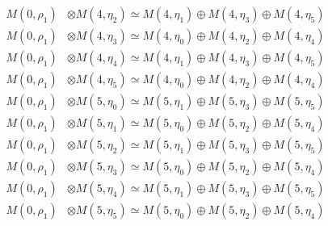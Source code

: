\begin{align*}
M(0,\rho_{1}) &\otimes M(4,\eta_{2}) \simeq M(4,\eta_{1}) \oplus M(4,\eta_{3}) \oplus M(4,\eta_{5}) \\
M(0,\rho_{1}) &\otimes M(4,\eta_{3}) \simeq M(4,\eta_{0}) \oplus M(4,\eta_{2}) \oplus M(4,\eta_{4}) \\
M(0,\rho_{1}) &\otimes M(4,\eta_{4}) \simeq M(4,\eta_{1}) \oplus M(4,\eta_{3}) \oplus M(4,\eta_{5}) \\
M(0,\rho_{1}) &\otimes M(4,\eta_{5}) \simeq M(4,\eta_{0}) \oplus M(4,\eta_{2}) \oplus M(4,\eta_{4}) \\
M(0,\rho_{1}) &\otimes M(5,\eta_{0}) \simeq M(5,\eta_{1}) \oplus M(5,\eta_{3}) \oplus M(5,\eta_{5}) \\
M(0,\rho_{1}) &\otimes M(5,\eta_{1}) \simeq M(5,\eta_{0}) \oplus M(5,\eta_{2}) \oplus M(5,\eta_{4}) \\
M(0,\rho_{1}) &\otimes M(5,\eta_{2}) \simeq M(5,\eta_{1}) \oplus M(5,\eta_{3}) \oplus M(5,\eta_{5}) \\
M(0,\rho_{1}) &\otimes M(5,\eta_{3}) \simeq M(5,\eta_{0}) \oplus M(5,\eta_{2}) \oplus M(5,\eta_{4}) \\
M(0,\rho_{1}) &\otimes M(5,\eta_{4}) \simeq M(5,\eta_{1}) \oplus M(5,\eta_{3}) \oplus M(5,\eta_{5}) \\
M(0,\rho_{1}) &\otimes M(5,\eta_{5}) \simeq M(5,\eta_{0}) \oplus M(5,\eta_{2}) \oplus M(5,\eta_{4}) \\
\end{align*}

